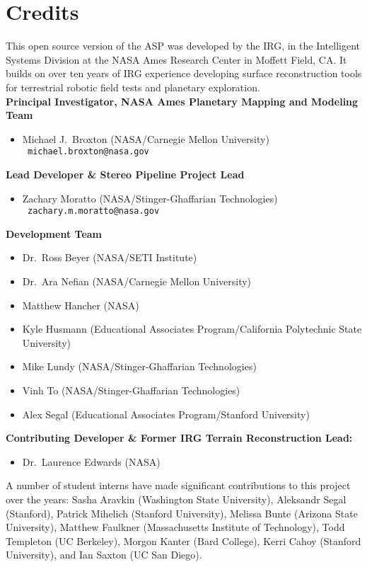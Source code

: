 
\chapter*{Credits}

This open source version of the \ac{ASP} was developed by the
\ac{IRG}, in the Intelligent Systems Division at the \ac{NASA} Ames
Research Center in Moffett Field, CA. It builds on over ten years
of IRG experience developing surface reconstruction tools for
terrestrial robotic field tests and planetary exploration. \\

{\bf Principal Investigator, NASA Ames Planetary Mapping and Modeling Team}
\begin {itemize}
\item Michael J.~Broxton (NASA/Carnegie Mellon University)\\ {\tt
  michael.broxton@nasa.gov}\\
\end{itemize}

{\bf Lead Developer \& Stereo Pipeline Project Lead}
\begin {itemize}
\item Zachary Moratto (NASA/Stinger-Ghaffarian Technologies)\\ {\tt
  zachary.m.moratto@nasa.gov}
\end{itemize}

{\bf Development Team}
\begin{itemize}
\item Dr.~Ross Beyer (NASA/SETI Institute)
\item Dr.~Ara Nefian (NASA/Carnegie Mellon University)
\item Matthew Hancher (NASA)
\item Kyle Husmann (Educational Associates Program/California Polytechnic State University)
\item Mike Lundy (NASA/Stinger-Ghaffarian Technologies)
\item Vinh To (NASA/Stinger-Ghaffarian Technologies)
\item Alex Segal (Educational Associates Program/Stanford University)
\end{itemize}

{\bf Contributing Developer \& Former IRG Terrain Reconstruction Lead:}
\begin{itemize}
\item Dr.\ Laurence Edwards (NASA)
\end{itemize}

A number of student interns have made significant contributions to
this project over the years: Sasha Aravkin (Washington State
University), Aleksandr Segal (Stanford), Patrick
Mihelich (Stanford University), Melissa Bunte (Arizona State
University), Matthew Faulkner (Massachusetts Institute of Technology),
Todd Templeton (UC Berkeley), Morgon Kanter (Bard College), Kerri
Cahoy (Stanford University), and Ian Saxton (UC San Diego).

